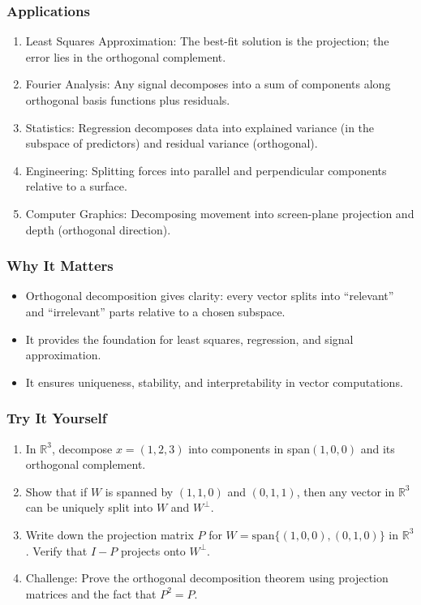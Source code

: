 \documentclass[
  letterpaper,
  DIV=11,
  numbers=noendperiod]{scrreprt}
\providecommand{\tightlist}{%
  \setlength{\itemsep}{0pt}\setlength{\parskip}{0pt}}
\begin{document}
\subsubsection{Applications}\label{applications-37}

\begin{enumerate}
\def\labelenumi{\arabic{enumi}.}
\tightlist
\item
  Least Squares Approximation: The best-fit solution is the projection;
  the error lies in the orthogonal complement.
\item
  Fourier Analysis: Any signal decomposes into a sum of components along
  orthogonal basis functions plus residuals.
\item
  Statistics: Regression decomposes data into explained variance (in the
  subspace of predictors) and residual variance (orthogonal).
\item
  Engineering: Splitting forces into parallel and perpendicular
  components relative to a surface.
\item
  Computer Graphics: Decomposing movement into screen-plane projection
  and depth (orthogonal direction).
\end{enumerate}

\subsubsection{Why It Matters}\label{why-it-matters-71}

\begin{itemize}
\tightlist
\item
  Orthogonal decomposition gives clarity: every vector splits into
  ``relevant'' and ``irrelevant'' parts relative to a chosen subspace.
\item
  It provides the foundation for least squares, regression, and signal
  approximation.
\item
  It ensures uniqueness, stability, and interpretability in vector
  computations.
\end{itemize}

\subsubsection{Try It Yourself}\label{try-it-yourself-74}

\begin{enumerate}
\def\labelenumi{\arabic{enumi}.}
\tightlist
\item
  In \(\mathbb{R}^3\), decompose \(x = (1,2,3)\) into components in
  span\((1,0,0)\) and its orthogonal complement.
\item
  Show that if \(W\) is spanned by \((1,1,0)\) and \((0,1,1)\), then any
  vector in \(\mathbb{R}^3\) can be uniquely split into \(W\) and
  \(W^\perp\).
\item
  Write down the projection matrix \(P\) for
  \(W = \text{span}\{(1,0,0),(0,1,0)\}\) in \(\mathbb{R}^3\). Verify
  that \(I-P\) projects onto \(W^\perp\).
\item
  Challenge: Prove the orthogonal decomposition theorem using projection
  matrices and the fact that \(P^2 = P\).
\end{enumerate}
\end{document}
